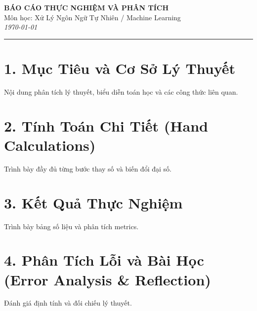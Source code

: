 \documentclass[11pt,a4paper]{article}
\begin{document}
\begin{center}
    {\LARGE\textbf{BÁO CÁO THỰC NGHIỆM VÀ PHÂN TÍCH}} \\[0.5em]
    {\normalsize Môn học: Xử Lý Ngôn Ngữ Tự Nhiên / Machine Learning} \\[0.3em]
    {\small\textit{\today}}
\end{center}

\vspace{0.8em}
\hrule
\vspace{1.2em}

\section*{1. Mục Tiêu và Cơ Sở Lý Thuyết}
Nội dung phân tích lý thuyết, biểu diễn toán học và các công thức liên quan.

\section*{2. Tính Toán Chi Tiết (Hand Calculations)}
Trình bày đầy đủ từng bước thay số và biến đổi đại số.

\section*{3. Kết Quả Thực Nghiệm}
Trình bày bảng số liệu và phân tích metrics.

\section*{4. Phân Tích Lỗi và Bài Học (Error Analysis \& Reflection)}
Đánh giá định tính và đối chiếu lý thuyết.
\end{document}
